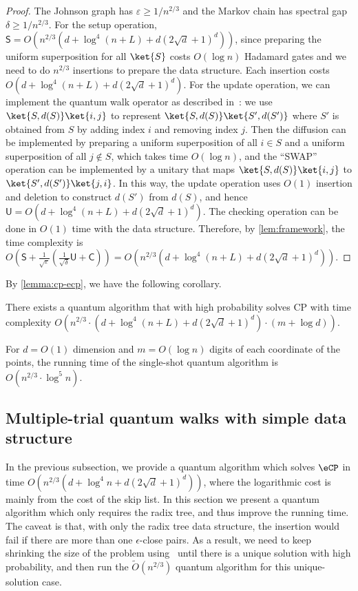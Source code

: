 \begin{proof}
  The Johnson graph has $\varepsilon \geq 1/n^{2/3}$ and the Markov chain has spectral gap $\delta \geq 1/n^{2/3}$. For the setup operation, $\mathsf{S} = O(n^{2/3}(d+\log^4(n+L) + d(2\sqrt{d}+1)^d))$, since preparing the uniform superposition for all $\ket{S}$ costs $O(\log n)$ Hadamard gates and we need to do $n^{2/3}$ insertions to prepare the data structure. Each insertion costs $O(d+\log^4(n+L) + d(2\sqrt{d}+1)^d)$. For the update operation, we can implement the quantum walk operator as described in~\cite{r28}: we use $\ket{S,d(S)}\ket{i,j}$ to represent $\ket{S,d(S)}\ket{S',d(S')}$ where $S'$ is obtained from $S$ by adding index $i$ and removing index $j$. Then the diffusion can be implemented by preparing a uniform superposition of all $i \in S$ and a uniform superposition of all $j \not\in S$, which takes time $O(\log n)$, and the ``SWAP'' operation can be implemented by a unitary that maps $\ket{S, d(S)}\ket{i,j}$ to $\ket{S',d(S')}\ket{j,i}$. In this way, the update operation uses $O(1)$ insertion and deletion to construct $d(S')$ from $d(S)$, and hence $\mathsf{U} = O(d+\log^4(n+L) + d(2\sqrt{d}+1)^d)$. The checking operation can be done in $O(1)$ time with the data structure. Therefore, by \cref{lem:framework}, the time complexity is $O(\mathsf{S} + \frac{1}{\sqrt{\varepsilon}}(\frac{1}{\sqrt{\delta}}\mathsf{U} + \mathsf{C})) = O(n^{2/3}(d+\log^4(n+L) + d(2\sqrt{d}+1)^d))$.
\end{proof}

By \cref{lemma:cp-ecp}, we have the following corollary.
\begin{corollary}
  There exists a quantum algorithm that with high probability solves \textsf{CP} with time complexity $O(n^{2/3}\cdot (d+\log^4(n+L) + d(2\sqrt{d}+1)^d)\cdot (m+\log d))$.
\end{corollary}

\begin{remark}
For $d=O(1)$ dimension and $m=O(\log n)$ digits of each coordinate of the points, the running time of the single-shot quantum algorithm is $O(n^{2/3}\cdot \log^5 n)$.
\end{remark}

\subsection{Multiple-trial quantum walks with simple data structure}
\label{sec:multi-shots}

In the previous subsection, we provide a quantum algorithm which solves $\eCP$ in time $O(n^{2/3}(d+\log^4 n + d(2\sqrt{d}+1)^d))$, where the logarithmic cost is mainly from the cost of the skip list. In this section we present a quantum algorithm which only requires the radix tree, and thus improve the running time. 
The caveat is that, with only the radix tree data structure, the insertion would fail if there are more than one $\epsilon$-close pairs. As a result, we need to keep shrinking the size of the problem using~\cite[Algorithm 3]{r5} until there is a unique solution with high probability, and then run the $\tilde{O}(n^{2/3})$ quantum algorithm for this unique-solution case. 

